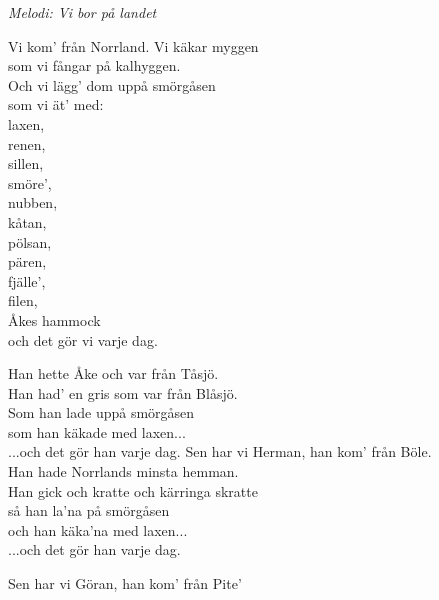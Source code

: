 {\footnotesize\textit{Melodi: Vi bor på landet}}\par
\vspace{10pt}
Vi kom' från Norrland. Vi käkar myggen\\
som vi fångar på kalhyggen.\\
Och vi lägg' dom uppå smörgåsen\\
som vi ät' med:\\
\hspace*{25pt} laxen,\\
\hspace*{25pt} renen,\\
\hspace*{25pt} sillen,\\
\hspace*{25pt} smöre',\\
\hspace*{25pt} nubben,\\
\hspace*{25pt} kåtan,\\
\hspace*{25pt} pölsan,\\
\hspace*{25pt} pären,\\
\hspace*{25pt} fjälle',\\
\hspace*{25pt} filen,\\
\hspace*{25pt} Åkes hammock\\
 och det gör vi varje dag.\par
\vspace{10pt}
Han hette Åke och var från Tåsjö.\\
Han had' en gris som var från Blåsjö.\\
Som han lade uppå smörgåsen\\
som han käkade med laxen...\\
...och det gör han varje dag.
\newpage
Sen har vi Herman, han kom' från Böle.\\
Han hade Norrlands minsta hemman.\\
Han gick och kratte och kärringa skratte\\
så han la'na på smörgåsen\\
och han käka'na med laxen...\\
...och det gör han varje dag.\par
\vspace{10pt}
Sen har vi Göran, han kom' från Pite'\\

